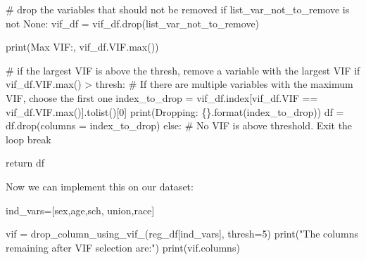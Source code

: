 \documentclass[
  letterpaper,
  DIV=11,
  numbers=noendperiod]{scrreprt}
\newenvironment{Shaded}{\begin{snugshade}}{\end{snugshade}}
\newcommand{\BuiltInTok}[1]{\textcolor[rgb]{0.00,0.23,0.31}{#1}}
\newcommand{\CommentTok}[1]{\textcolor[rgb]{0.37,0.37,0.37}{#1}}
\newcommand{\ControlFlowTok}[1]{\textcolor[rgb]{0.00,0.23,0.31}{#1}}
\newcommand{\DecValTok}[1]{\textcolor[rgb]{0.68,0.00,0.00}{#1}}
\newcommand{\KeywordTok}[1]{\textcolor[rgb]{0.00,0.23,0.31}{#1}}
\newcommand{\NormalTok}[1]{\textcolor[rgb]{0.00,0.23,0.31}{#1}}
\newcommand{\OperatorTok}[1]{\textcolor[rgb]{0.37,0.37,0.37}{#1}}
\newcommand{\SpecialCharTok}[1]{\textcolor[rgb]{0.37,0.37,0.37}{#1}}
\newcommand{\StringTok}[1]{\textcolor[rgb]{0.13,0.47,0.30}{#1}}
\newcommand{\VariableTok}[1]{\textcolor[rgb]{0.07,0.07,0.07}{#1}}
\begin{document}
\begin{Shaded}
\begin{Highlighting}[]
        \CommentTok{\# drop the variables that should not be removed}
        \ControlFlowTok{if}\NormalTok{ list\_var\_not\_to\_remove }\KeywordTok{is} \KeywordTok{not} \VariableTok{None}\NormalTok{:}
\NormalTok{            vif\_df }\OperatorTok{=}\NormalTok{ vif\_df.drop(list\_var\_not\_to\_remove)}
            
        \BuiltInTok{print}\NormalTok{(}\StringTok{\textquotesingle{}Max VIF:\textquotesingle{}}\NormalTok{, vif\_df.VIF.}\BuiltInTok{max}\NormalTok{())}
        
        \CommentTok{\# if the largest VIF is above the thresh, remove a variable with the largest VIF}
        \ControlFlowTok{if}\NormalTok{ vif\_df.VIF.}\BuiltInTok{max}\NormalTok{() }\OperatorTok{\textgreater{}}\NormalTok{ thresh:}
            \CommentTok{\# If there are multiple variables with the maximum VIF, choose the first one}
\NormalTok{            index\_to\_drop }\OperatorTok{=}\NormalTok{ vif\_df.index[vif\_df.VIF }\OperatorTok{==}\NormalTok{ vif\_df.VIF.}\BuiltInTok{max}\NormalTok{()].tolist()[}\DecValTok{0}\NormalTok{]}
            \BuiltInTok{print}\NormalTok{(}\StringTok{\textquotesingle{}Dropping: }\SpecialCharTok{\{\}}\StringTok{\textquotesingle{}}\NormalTok{.}\BuiltInTok{format}\NormalTok{(index\_to\_drop))}
\NormalTok{            df }\OperatorTok{=}\NormalTok{ df.drop(columns }\OperatorTok{=}\NormalTok{ index\_to\_drop)}
        \ControlFlowTok{else}\NormalTok{:}
            \CommentTok{\# No VIF is above threshold. Exit the loop}
            \ControlFlowTok{break}

    \ControlFlowTok{return}\NormalTok{ df}
\end{Highlighting}
\end{Shaded}

Now we can implement this on our dataset:

\begin{Shaded}
\begin{Highlighting}[]
\NormalTok{ind\_vars}\OperatorTok{=}\NormalTok{[}\StringTok{\textquotesingle{}sex\textquotesingle{}}\NormalTok{,}\StringTok{\textquotesingle{}age\textquotesingle{}}\NormalTok{,}\StringTok{\textquotesingle{}sch\textquotesingle{}}\NormalTok{, }\StringTok{\textquotesingle{}union\textquotesingle{}}\NormalTok{,}\StringTok{\textquotesingle{}race\textquotesingle{}}\NormalTok{]}

\NormalTok{vif }\OperatorTok{=}\NormalTok{ drop\_column\_using\_vif\_(reg\_df[ind\_vars], thresh}\OperatorTok{=}\DecValTok{5}\NormalTok{)}
\BuiltInTok{print}\NormalTok{(}\StringTok{"The columns remaining after VIF selection are:"}\NormalTok{)}
\BuiltInTok{print}\NormalTok{(vif.columns)}
\end{Highlighting}
\end{Shaded}
\end{document}

